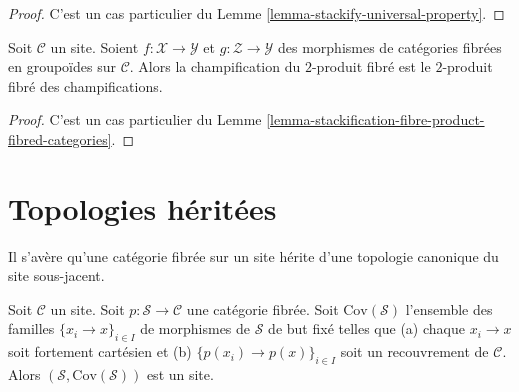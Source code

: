 \begin{proof}
C'est un cas particulier du
Lemme \ref{lemma-stackify-universal-property}.
\end{proof}

\begin{lemma}
\label{lemma-stackification-fibre-product-categories-fibred-in-groupoids}
Soit $\mathcal{C}$ un site.
Soient $f : \mathcal{X} \to \mathcal{Y}$ et $g : \mathcal{Z} \to \mathcal{Y}$
des morphismes de catégories fibrées en groupoïdes sur $\mathcal{C}$.
Alors la champification du $2$-produit fibré est le $2$-produit
fibré des champifications.
\end{lemma}

\begin{proof}
C'est un cas particulier du
Lemme \ref{lemma-stackification-fibre-product-fibred-categories}.
\end{proof}





\section{Topologies héritées}
\label{section-topology}

\noindent
Il s'avère qu'une catégorie fibrée sur un site hérite d'une topologie
canonique du site sous-jacent.

\begin{lemma}
\label{lemma-topology-inherited}
Soit $\mathcal{C}$ un site. Soit $p : \mathcal{S} \to \mathcal{C}$
une catégorie fibrée. Soit $\text{Cov}(\mathcal{S})$
l'ensemble des familles $\{x_i \to x\}_{i \in I}$ de morphismes de $\mathcal{S}$
de but fixé telles que (a) chaque $x_i \to x$ soit fortement cartésien
et (b) $\{p(x_i) \to p(x)\}_{i \in I}$ soit un recouvrement de $\mathcal{C}$.
Alors $(\mathcal{S}, \text{Cov}(\mathcal{S}))$ est un site.
\end{lemma}

